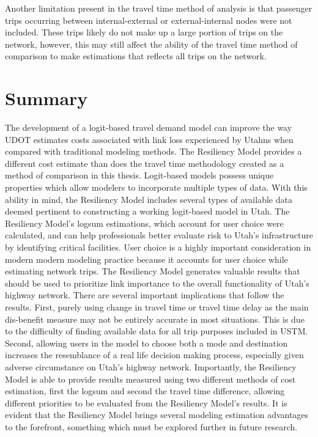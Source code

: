 Another limitation present in the travel time method of analysis is that passenger
trips occurring between internal-external or external-internal nodes were not
included. These trips likely do not make up a large portion of trips on the network,
however, this may still affect the ability of the travel time method of comparison
to make estimations that reflects all trips on the network.

\section{Summary}

The development of a logit-based travel demand model can improve the way UDOT
estimates costs associated with link loss experienced by Utahns when compared
with traditional modeling methods. The Resiliency Model provides a different cost
estimate than does the travel time methodology created as a method of comparison
in this thesis. Logit-based models possess unique properties which allow modelers
to incorporate multiple types of data. With this ability in mind, the Resiliency
Model includes several types of available data deemed pertinent to
constructing a working logit-based model in Utah. The Resiliency Model's
logsum estimations, which account for user choice were calculated, and can help
professionals better evaluate risk to Utah's infrastructure by identifying
critical facilities. User choice is a highly important consideration in modern
modern modeling practice because it accounts for user choice while estimating
network trips. The Resiliency Model generates valuable results that should
be used to prioritize link importance to the overall functionality of Utah's
highway network. There are several important implications that follow the
results. First, purely
using change in travel time or travel time delay as the main dis-benefit measure may not
be entirely accurate in most situations. This is due to the difficulty of finding
available data for all trip purposes included in USTM. Second, allowing users in the model
to choose both a mode and destination increases the resemblance of a real life
decision making process, especially given adverse circumstance on Utah's
highway network. Importantly, the Resiliency Model is able to provide results measured
using two different methods of cost estimation, first the logsum and second the travel time difference,
allowing different priorities to be evaluated from the Resiliency Model's results.
It is evident that the Resiliency Model brings several
modeling estimation advantages to the forefront, something which must be
explored further in future research.
